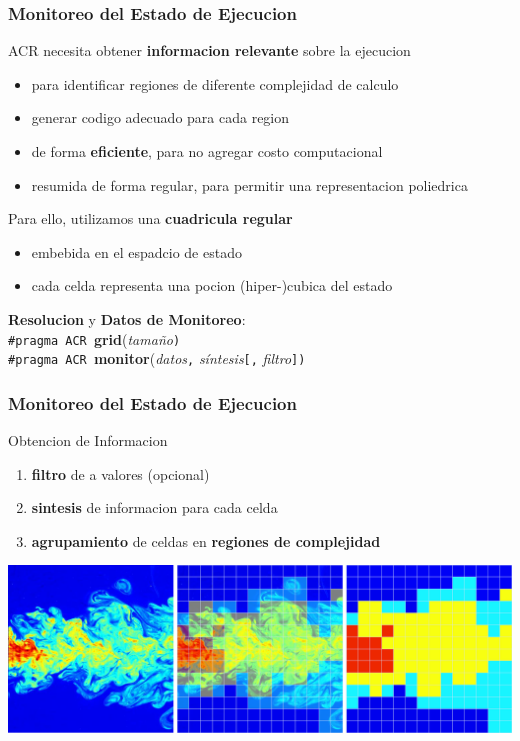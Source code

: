 \documentclass{beamer}\usetheme{Madrid} %
\begin{document}
\begin{frame}[fragile]
\frametitle{Monitoreo del Estado de Ejecucion}
\begin{block}{}
ACR necesita obtener \textbf{informacion relevante} sobre la ejecucion
\begin{itemize}
\item para identificar regiones de diferente complejidad de calculo
\item generar codigo adecuado para cada region 
\item de forma \textbf{eficiente}, para no agregar costo computacional
\item resumida de forma regular, para permitir una representacion poliedrica
\end{itemize}
\end{block}
\begin{block}{}
Para ello, utilizamos una \textbf{cuadricula regular} 
\begin{itemize}
\item embebida en el espadcio de estado
\item cada celda representa una pocion (hiper-)cubica del estado
\end{itemize} 
\end{block}
\begin{block}{}
\textbf{Resolucion} y \textbf{Datos de Monitoreo}: \\
\lstinline{#pragma ACR }\textbf{grid}(\textit{tamaño}\lstinline{)} \\
\lstinline{#pragma ACR }\textbf{monitor}(\textit{datos}\lstinline{,} 
										\textit{síntesis}\lstinline{[,} 
										\textit{filtro}\lstinline{])} 
\end{block} 
\end{frame}
\begin{frame}
\frametitle{Monitoreo del Estado de Ejecucion}
\begin{block}{Obtencion de Informacion}
\begin{enumerate} 
\item \textbf{filtro} de a valores  (opcional)
\item \textbf{sintesis} de informacion para cada celda
\item \textbf{agrupamiento} de celdas en \textbf{regiones de complejidad}
\end{enumerate}
\end{block}
\begin{center}
\includegraphics[scale=0.20]{img/turbulent_legal.png} 
\end{center}
\end{frame}
\end{document}
